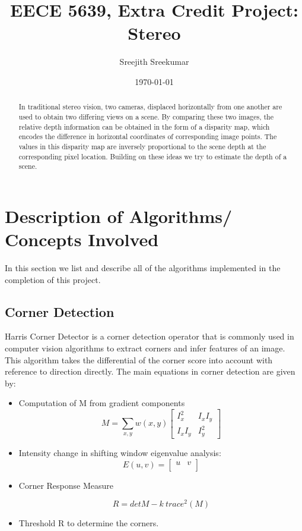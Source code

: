 \documentclass[letterpaper,11pt]{article}
\title{\textbf{EECE 5639, Extra Credit Project:
\\{\Large Stereo}}}
\author{Sreejith Sreekumar}
\date{\today}
\begin{document}
\maketitle

\begin{abstract}
  In traditional stereo vision, two cameras, displaced horizontally from one another are used to obtain two differing views on a scene. By comparing these two images, the relative depth information can be obtained in the form of a disparity map, which encodes the difference in horizontal coordinates of corresponding image points. The values in this disparity map are inversely proportional to the scene depth at the corresponding pixel location. Building on these ideas we try to estimate the depth of a scene.
 \end{abstract}


\section{Description of Algorithms/ Concepts Involved}
In this section we list and describe all of the algorithms implemented in the completion of this
project.

\subsection{Corner Detection}
Harris Corner Detector is a corner detection operator that is commonly used in computer vision algorithms to extract corners and infer features of an image. This algorithm takes the differential of the corner score into account with reference to direction directly. The main equations in corner detection are given by:

\begin{itemize}
\item  Computation of M from gradient components
\[
  M = \sum\limits_{x,y} w(x,y)
    \begin{bmatrix}
      I_{x}^{2} & I_{x}I_{y} \\
      I_{x}I_{y} & I_{y} ^{2}
    \end{bmatrix}
\]
\item Intensity change in shifting window eigenvalue analysis:
\[
E(u, v) =
    \begin{bmatrix}
      u & v \\
    \end{bmatrix}
    \]
\item Corner Response Measure

\[
 R = det M - k\ trace^{2}(M)
\]

\item Threshold R to determine the corners.

\end{itemize}
\end{document}
